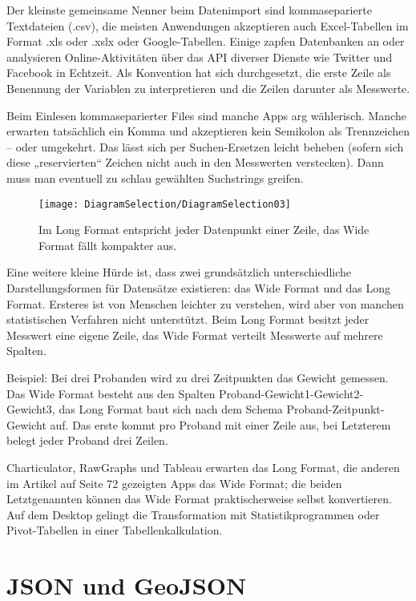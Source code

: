 Der kleinste gemeinsame Nenner beim Datenimport sind kommaseparierte Textdateien (.csv), die meisten Anwendungen akzeptieren auch Excel-Tabellen im Format .xls oder .xslx oder Google-Tabellen. Einige zapfen Datenbanken an oder analysieren Online-Aktivitäten über das API diverser Dienste wie Twitter und Facebook in Echtzeit. Als Konvention hat sich durchgesetzt, die erste Zeile als Benennung der Variablen zu interpretieren und die Zeilen darunter als Messwerte.
	
Beim Einlesen kommaseparierter Files sind manche Apps arg wählerisch. Manche erwarten tatsächlich ein Komma und akzeptieren kein Semikolon als Trennzeichen – oder umgekehrt. Das lässt sich per Suchen-Ersetzen leicht beheben (sofern sich diese „reservierten“ Zeichen nicht auch in den Messwerten verstecken). Dann muss man eventuell zu schlau gewählten Suchstrings greifen.

\begin{figure}
	\texttt{[image: DiagramSelection/DiagramSelection03]}
	\caption[Long Format]{Im Long Format entspricht jeder Datenpunkt einer Zeile, das Wide Format fällt kompakter aus.}
\end{figure}
	
Eine weitere kleine Hürde ist, dass zwei grundsätzlich unterschiedliche Darstellungsformen für Datensätze existieren: das Wide Format und das Long Format. Ersteres ist von Menschen leichter zu verstehen, wird aber von manchen statistischen Verfahren nicht unterstützt. Beim Long Format besitzt jeder Messwert eine eigene Zeile, das Wide Format verteilt Messwerte auf mehrere Spalten.

Beispiel: Bei drei Probanden wird zu drei Zeitpunkten das Gewicht gemessen. Das Wide Format besteht aus den Spalten Proband-Gewicht1-Gewicht2-Gewicht3, das Long Format baut sich nach dem Schema Proband-Zeitpunkt-Gewicht auf. Das erste kommt pro Proband mit einer Zeile aus, bei Letzterem belegt jeder Proband drei Zeilen.

Charticulator, RawGraphs und Tableau erwarten das Long Format, die anderen im Artikel auf Seite 72 gezeigten Apps das Wide Format; die beiden Letztgenannten können das Wide Format praktischerweise selbst konvertieren. Auf dem Desktop gelingt die Transformation mit Statistikprogrammen oder Pivot-Tabellen in einer Tabellenkalkulation.

\section{JSON und GeoJSON}


